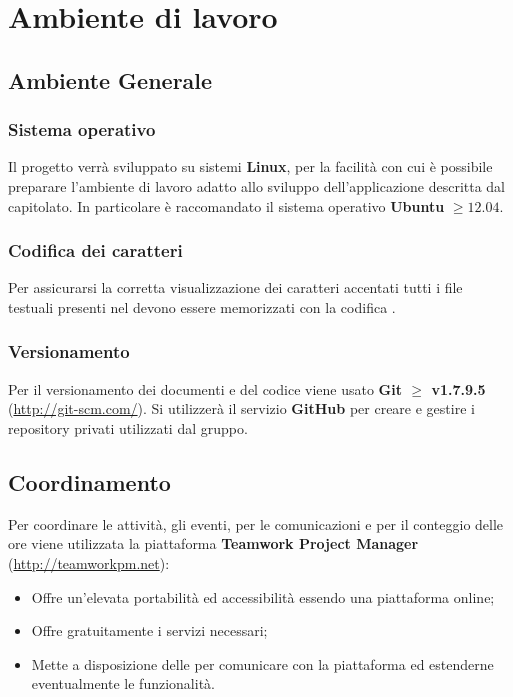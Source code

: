 \section{Ambiente di lavoro}
	
	\subsection{Ambiente Generale}
		
		\subsubsection{Sistema operativo}
		
		Il progetto verrà sviluppato su sistemi \textbf{Linux}, per la facilità con cui è possibile preparare l'ambiente di lavoro adatto allo sviluppo dell'applicazione descritta dal capitolato. In particolare è raccomandato il sistema operativo \textbf{Ubuntu} $\geq 12.04$.
		
		\subsubsection{Codifica dei caratteri}
		
		Per assicurarsi la corretta visualizzazione dei caratteri accentati tutti i file testuali presenti nel  devono essere memorizzati con la codifica \textbf{}.
		
		\subsubsection{Versionamento}
		\label{github}
		
		Per il versionamento dei documenti e del codice viene usato \textbf{Git $\ge$ v1.7.9.5} (\url{http://git-scm.com/}).
		Si utilizzerà il servizio \textbf{GitHub} per creare e gestire i repository privati utilizzati dal gruppo.
		
	\subsection{Coordinamento}
	\label{teamworkpm}
	
		Per coordinare le attività, gli eventi, per le comunicazioni e per il conteggio delle ore viene utilizzata la piattaforma \textbf{Teamwork Project Manager} (\url{http://teamworkpm.net}):
		\begin{itemize}
			\item Offre un'elevata portabilità ed accessibilità essendo una piattaforma online;
			\item Offre gratuitamente i servizi necessari;
			\item Mette a disposizione delle  per comunicare con la piattaforma ed estenderne eventualmente le funzionalità.
		\end{itemize}
		
